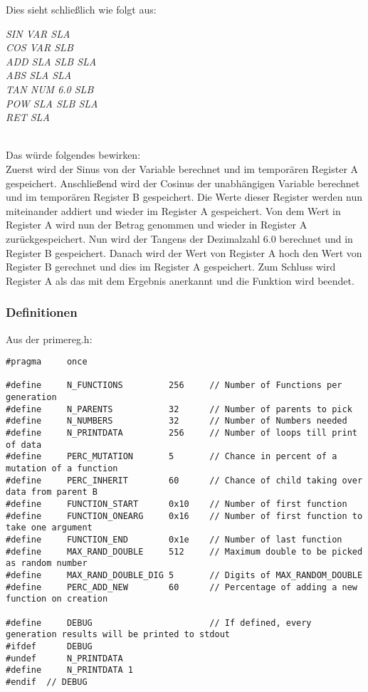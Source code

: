 \documentclass[a4paper,12pt]{article}
\begin{document}
\noindent Dies sieht schließlich wie folgt aus:

\noindent 
\begin{center}
\textit{
SIN VAR SLA\\ COS VAR SLB \\
ADD SLA SLB SLA\\
ABS SLA SLA\\
TAN NUM 6.0 SLB\\
POW SLA SLB SLA\\
RET SLA
}
\end{center}

\noindent \\ Das würde folgendes bewirken:\\
Zuerst wird der Sinus von der Variable berechnet und im temporären Register A gespeichert. Anschließend wird der Cosinus der unabhängigen Variable berechnet und im temporären Register B gespeichert. Die Werte dieser Register werden nun miteinander addiert und wieder im Register A gespeichert. Von dem Wert in Register A wird nun der Betrag genommen und wieder in Register A zurückgespeichert. Nun wird der Tangens der Dezimalzahl 6.0 berechnet und in Register B gespeichert. Danach wird der Wert von Register A hoch den Wert von Register B gerechnet und dies im Register A gespeichert. Zum Schluss wird Register A als das mit dem Ergebnis anerkannt und die Funktion wird beendet. 

\newpage
\subsubsection{Definitionen}
Aus der primereg.h:

\begin{verbatim}
#pragma     once

#define     N_FUNCTIONS			256		// Number of Functions per generation
#define     N_PARENTS			32		// Number of parents to pick
#define     N_NUMBERS			32		// Number of Numbers needed
#define     N_PRINTDATA			256		// Number of loops till print of data
#define     PERC_MUTATION		5		// Chance in percent of a mutation of a function
#define		PERC_INHERIT		60		// Chance of child taking over data from parent B
#define     FUNCTION_START		0x10	// Number of first function
#define     FUNCTION_ONEARG		0x16	// Number of first function to take one argument
#define     FUNCTION_END		0x1e	// Number of last function
#define     MAX_RAND_DOUBLE		512		// Maximum double to be picked as random number
#define		MAX_RAND_DOUBLE_DIG	5		// Digits of MAX_RANDOM_DOUBLE
#define     PERC_ADD_NEW		60		// Percentage of adding a new function on creation

#define     DEBUG                       // If defined, every generation results will be printed to stdout
#ifdef      DEBUG
#undef      N_PRINTDATA
#define     N_PRINTDATA 1
#endif  // DEBUG
\end{verbatim}
\newpage
\end{document}
